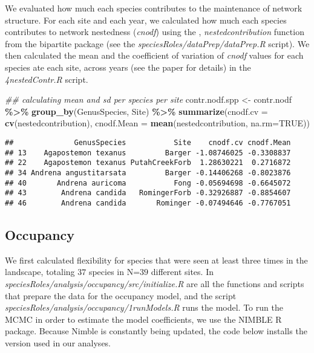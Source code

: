 \documentclass[
]{article}
\newenvironment{Shaded}{\begin{snugshade}}{\end{snugshade}}
\newcommand{\CommentTok}[1]{\textcolor[rgb]{0.56,0.35,0.01}{\textit{#1}}}
\newcommand{\DataTypeTok}[1]{\textcolor[rgb]{0.13,0.29,0.53}{#1}}
\newcommand{\KeywordTok}[1]{\textcolor[rgb]{0.13,0.29,0.53}{\textbf{#1}}}
\newcommand{\NormalTok}[1]{#1}
\newcommand{\OperatorTok}[1]{\textcolor[rgb]{0.81,0.36,0.00}{\textbf{#1}}}
\newcommand{\OtherTok}[1]{\textcolor[rgb]{0.56,0.35,0.01}{#1}}
\newcommand{\StringTok}[1]{\textcolor[rgb]{0.31,0.60,0.02}{#1}}
\begin{document}
We evaluated how much each species contributes to the maintenance of
network structure. For each site and each year, we calculated how much
each species contributes to network nestedness (\textit{cnodf}) using
the , \emph{nestedcontribution} function from the bipartite package (see
the \emph{speciesRoles/dataPrep/dataPrep.R} script). We then calculated
the mean and the coefficient of variation of \textit{cnodf} values for
each species ate each site, across years (see the paper for details) in
the \emph{4nestedContr.R} script.

\begin{Shaded}
\begin{Highlighting}[]
\CommentTok{\#\# calculating mean and sd per species per site}
\NormalTok{contr.nodf.spp \textless{}{-}}\StringTok{ }\NormalTok{contr.nodf }\OperatorTok{\%\textgreater{}\%}
\StringTok{  }\KeywordTok{group\_by}\NormalTok{(GenusSpecies, Site)  }\OperatorTok{\%\textgreater{}\%}
\StringTok{  }\KeywordTok{summarize}\NormalTok{(}\DataTypeTok{cnodf.cv =} \KeywordTok{cv}\NormalTok{(nestedcontribution),}
            \DataTypeTok{cnodf.Mean =} \KeywordTok{mean}\NormalTok{(nestedcontribution, }\DataTypeTok{na.rm=}\OtherTok{TRUE}\NormalTok{))}
\end{Highlighting}
\end{Shaded}

\begin{verbatim}
##              GenusSpecies           Site    cnodf.cv cnodf.Mean
## 13    Agapostemon texanus         Barger -1.08746025 -0.3308837
## 22    Agapostemon texanus PutahCreekForb  1.28630221  0.2716872
## 34 Andrena angustitarsata         Barger -0.14406268 -0.8023876
## 40       Andrena auricoma           Fong -0.05694698 -0.6645072
## 43        Andrena candida   RomingerForb -0.32926887 -0.8854607
## 46        Andrena candida       Rominger -0.07494646 -0.7767051
\end{verbatim}

\hypertarget{occupancy}{%
\subsection{Occupancy}\label{occupancy}}

We first calculated flexibility for species that were seen at least
three times in the landscape, totaling \(37\) species in N=\(39\)
different sites. In
\emph{speciesRoles/analysis/occupancy/src/initialize.R} are all the
functions and scripts that prepare the data for the occupancy model, and
the script \emph{speciesRoles/analysis/occupancy/1runModels.R} runs the
model. To run the MCMC in order to estimate the model coefficients, we
use the NIMBLE R package. Because Nimble is constantly being updated,
the code below installs the version used in our analyses.
\end{document}
